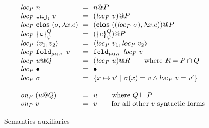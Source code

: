 \documentclass[10pt]{article}
\makeatletter
\newcommand{\kw}[1]{\ensuremath{\mathtt{#1}}}
\newcommand{\trec}[2]{\ensuremath{\mu {#1}.{#2}}}
\newcommand{\einj}[2]{\ensuremath{\kw{inj}_{#1}~{#2}}}
\newcommand{\epair}[2]{\ensuremath{\langle {#1}, {#2} \rangle}}
\newcommand{\elam}[2]{\ensuremath{\lambda {#1}.{#2}}}
\newcommand{\efold}[2]{\ensuremath{\kw{fold}_{#1}~{#2}}}
\newcommand{\vshare}[3]{\ensuremath{\{{#3}\}^{#1}_{#2}}}
\newcommand{\vloc}[2]{\ensuremath{{#1}\kw{@}{#2}}}
\newcommand{\vclos}[2]{\ensuremath{\mathbf{clos}~({#1},{#2})}}
\newcommand{\vcrash}{\ensuremath{\bullet}}
\newcommand{\env}{\ensuremath{\sigma}}
\newcommand{\locof}[2]{\ensuremath{\mathit{loc}_{#1}~{#2}}}
\newcommand{\getat}[2]{\ensuremath{\mathit{on}_{#1}~{#2}}}
\makeatother
\begin{document}
\begin{figure}
\[\begin{array}{l@{~~=~~}l}
    \locof{P}{n} & \vloc{n}{P} \\
    \locof{P}{\einj{i}{v}} & \vloc{(\locof{P}{v})}{P} \\
    \locof{P}{\vclos{\env}{\elam{x}{e}}} & \vloc{(\vclos{(\locof{P}{\env})}{\elam{x}{e}})}{P}\\
    \locof{P}{\vshare{Q}{\psi}{e}} & \vloc{(\vshare{Q}{\psi}{e})}{P} \\
    \locof{P}{\epair{v_1}{v_2}} & \epair{\locof{P}{v_1}}{\locof{P}{v_2}}\\
    \locof{P}{ \efold{\trec{\alpha}{\tau}}{v}} &  \efold{\trec{\alpha}{\tau}}{\locof{P}{v}}\\
    \locof{P}{\vloc{u}{Q}} & \vloc{(\locof{P}{u})}{R} \qquad\text{where }R = P \cap Q\\
    \locof{P}{\vcrash} & \vcrash\\
    \locof{P}{\sigma} & \{ x \mapsto v' \mid \sigma(x) = v \land \locof{P}{v} = v' \}\\
    \multicolumn{2}{c}{}\\
    \getat{P}{(\vloc{u}{Q})} & u \qquad \text{where }Q \vdash P\\
    \getat{P}{v} & v \qquad \text{for all other $v$ syntactic forms}\\
  \end{array}
\]
\caption{Semantics auxiliaries}
\label{fig:auxsem}
\end{figure}
\end{document}

